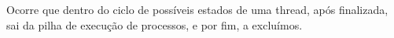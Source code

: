 \documentclass[a4paper,12pt]{article} %
\begin{document}
Ocorre que dentro do ciclo de possíveis estados de uma thread, após finalizada, sai da pilha de execução de processos,
e por fim, a excluímos.

\clearpage
\printbibliography
\end{document}
